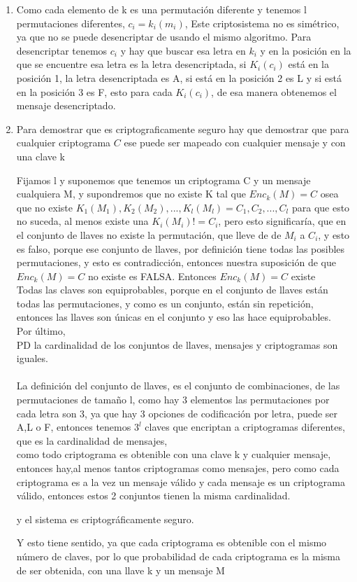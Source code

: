 \documentclass[11pt]{article}
\begin{document}
\begin{enumerate}[label=\alph*)]
    \item Como cada elemento de k es una permutación diferente y tenemos l permutaciones diferentes,
    $c_i = k_i(m_i)$, Este criptosistema no es simétrico, ya que no se puede desencriptar de usando el mismo algoritmo. Para desencriptar tenemos $c_i$ y hay que buscar esa letra en $k_i$ y en la posición en la que se encuentre esa letra es la letra desencriptada, si $K_i(c_i)$ está en la posición 1, la letra desencriptada es A, si está en la posición 2 es L y si está en la posición 3 es F, esto para cada $K_i(c_i)$, de esa manera obtenemos el mensaje desencriptado.
    \item 
    Para demostrar que es criptograficamente seguro hay que demostrar que para cualquier criptograma $C$ ese puede ser mapeado con cualquier mensaje y con una clave k
    
    Fijamos l y suponemos que tenemos un criptograma C y un mensaje cualquiera M, y supondremos que no existe K tal que $Enc_k(M) = C$ osea que no existe $K_1(M_1),K_2(M_2),...,K_l(M_l) = C_1,C_2,...,C_l$ para que esto no suceda, al menos existe una $K_i(M_i) != C_i$, pero esto significaría, que en el conjunto de llaves no existe la permutación, que lleve de de $M_i$ a $C_i$, y esto es falso, porque ese conjunto de llaves, por definición tiene todas las posibles permutaciones, y esto es contradicción, entonces nuestra suposición de que  $Enc_k(M) = C$ no existe es FALSA.
    Entonces  $Enc_k(M) = C$ existe\\
    Todas las claves son equiprobables, porque en el conjunto de llaves están todas las permutaciones, y como es un conjunto, están sin repetición, entonces las llaves son únicas en el conjunto y eso las hace equiprobables.\\
    Por último, \\PD la cardinalidad de los conjuntos de llaves, mensajes y criptogramas son iguales. \\\\
    La definición del conjunto de llaves, es el conjunto de combinaciones, de las permutaciones de tamaño l, como hay 3 elementos las permutaciones por cada letra son 3, ya que hay 3 opciones de codificación por letra, puede ser A,L o F, entonces tenemos $3^l$ claves que encriptan a criptogramas diferentes, que es la cardinalidad de mensajes,\\
    como todo criptograma es obtenible con una clave k y cualquier mensaje, entonces hay,al menos tantos criptogramas como mensajes, pero como cada criptograma es a la vez un mensaje válido y cada mensaje es un criptograma válido, entonces estos 2 conjuntos tienen la misma cardinalidad.
    
    y el sistema es criptográficamente seguro.
    
    Y esto tiene sentido, ya que cada criptograma es obtenible con el mismo número de claves, por lo que probabilidad de cada criptograma es la misma de ser obtenida, con una llave k y un mensaje M
\end{enumerate}
         
\end{document}
